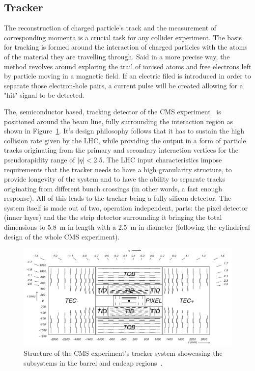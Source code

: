 \subsection{Tracker}
\hspace{10pt} The reconstruction of charged particle's track and the measurement of corresponding momenta is a crucial task for any collider experiment. The basis for tracking is formed around the interaction of charged particles with the atoms of the material they are travelling through. Said in a more precise way, the method revolves around exploring the trail of ionised atoms and free electrons left by particle moving in a magnetic field. If an electric filed is introduced in order to separate those electron-hole pairs, a current pulse will be created allowing for a "hit" signal to be detected.

\hspace{10pt} The, semiconductor based, tracking detector of the CMS experiment~\cite{cms:tdr}\cite{tracker_performance}\cite{Tracker:scheme} is positioned around the beam line, fully surrounding the interaction region as shown in Figure~\ref{fig:tracker}. It's design philosophy follows that it has to sustain the high collision rate given by the LHC, while providing the output in a form of particle tracks originating from the primary and secondary interaction vertices for the pseudorapidity range of $|\eta|<$2.5. The LHC input characteristics impose requirements that the tracker needs to have a high granularity structure, to provide longevity of the system and to have the ability to separate tracks originating from different bunch crossings (in other words, a fast enough response). All of this leads to the tracker being a fully silicon detector. The system itself is made out of two, operation independent, parts: the pixel detector (inner layer) and the the strip detector surrounding it bringing the total dimensions to 5.8~m in length with a 2.5~m in diameter (following the cylindrical design of the whole CMS experiment).
\hspace{10pt} 
\begin{figure}[htbp]
  \centering
    \includegraphics[width=\textwidth]{CMS_experiment/cmstracker.png}
  \caption[Structure of the CMS experiment's tracker system showcasing the subsystems in the barrel and endcap regions.]{Structure of the CMS experiment's tracker system showcasing the subsystems in the barrel and endcap regions~\cite{Tracker:scheme}.}
  \label{fig:tracker}
\end{figure}

